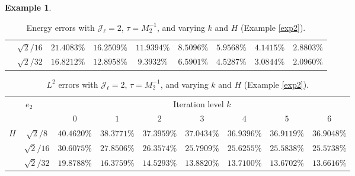 \documentclass{article}[11pt]
\theoremstyle{definition}
\newtheorem{exmp}{Example}[section]
\begin{document}
\begin{exmp}
\begin{table}[ht]
\begin{tabular}{cc||ccccccc}
\multicolumn{1}{c|}{} &  
$\sqrt{2}/16$ & $21.4083\%$ & $16.2509\%$ & $11.9394\%$ & $8.5096\%$ & $5.9568\%$ & $4.1415\%$ & $2.8803\%$ \\

\multicolumn{1}{c|}{} &  
$\sqrt{2}/32$ & $16.8212\%$ & $12.8958\%$ & $9.3932\%$ & $6.5901\%$ & $4.5287\%$ & $3.0844\%$ & $2.0960\%$ \\

\hline
\end{tabular}
\caption{Energy errors with $\mathcal{J}_{\ell} = 2$, $\tau = M_2^{-1}$, and varying $k$ and $H$ (Example \ref{exp2}).}
\label{tab:exp2-v-subopt}
\end{table}

\begin{table}[ht]
\centering
\begin{tabular}{cc||ccccccc}
\hline
\multicolumn{2}{c||}{\multirow{2}{*}{$e_2$}}   & \multicolumn{7}{c}{Iteration level $k$}           \\ \cline{3-9} 
\multicolumn{2}{c||}{} &   $0$ & $1$   & $2$   & $3$   & $4$   &$5$ & $6$ \\ 
\hline \hline
\multicolumn{1}{c|}{\multirow{3}{*}{$H$}} & 
$\sqrt{2}/8$ & $40.4620\%$ & $38.3771\%$ & $37.3959\%$ & $37.0434\%$ & $36.9396\%$ & $36.9119\%$ & $36.9048\%$ \\

\multicolumn{1}{c|}{} &  
$\sqrt{2}/16$ & $30.6075\%$ & $27.8506\%$ & $26.3574\%$ & $25.7909\%$ & $25.6255\%$ & $25.5838\%$ & $25.5738\%$ \\

\multicolumn{1}{c|}{} &  
$\sqrt{2}/32$ & $19.8788\%$ & $16.3759\%$ & $14.5293\%$ & $13.8820\%$ & $13.7100\%$ & $13.6702\%$ & $13.6616\%$ \\

\hline
\end{tabular}
\caption{$L^2$ errors with $\mathcal{J}_{\ell} = 2$, $\tau = M_2^{-1}$, and varying $k$ and $H$ (Example \ref{exp2}).}
\label{tab:exp2-p-subopt}
\end{table}


\end{exmp}
\end{document}

